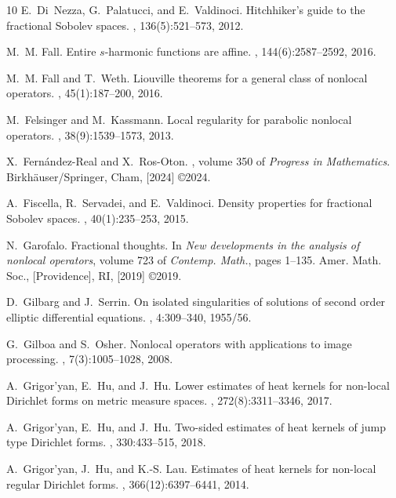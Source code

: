 \documentclass[11pt]{amsart}
\theoremstyle{plain}
\theoremstyle{definition}
\numberwithin{equation}{section}
\begin{document}
\begin{thebibliography}{10}
E.~Di~Nezza, G.~Palatucci, and E.~Valdinoci.
\newblock Hitchhiker's guide to the fractional {S}obolev spaces.
, 136(5):521--573, 2012.

M.~M. Fall.
\newblock Entire {$s$}-harmonic functions are affine.
, 144(6):2587--2592, 2016.

M.~M. Fall and T.~Weth.
\newblock Liouville theorems for a general class of nonlocal operators.
, 45(1):187--200, 2016.

M.~Felsinger and M.~Kassmann.
\newblock Local regularity for parabolic nonlocal operators.
, 38(9):1539--1573, 2013.

X.~Fern\'andez-Real and X.~Ros-Oton.
, volume 350 of {\em
  Progress in Mathematics}.
\newblock Birkh\"auser/Springer, Cham, [2024] \copyright 2024.

A.~Fiscella, R.~Servadei, and E.~Valdinoci.
\newblock Density properties for fractional {S}obolev spaces.
, 40(1):235--253, 2015.

N.~Garofalo.
\newblock Fractional thoughts.
\newblock In {\em New developments in the analysis of nonlocal operators},
  volume 723 of {\em Contemp. Math.}, pages 1--135. Amer. Math. Soc.,
  [Providence], RI, [2019] \copyright 2019.

D.~Gilbarg and J.~Serrin.
\newblock On isolated singularities of solutions of second order elliptic
  differential equations.
, 4:309--340, 1955/56.

G.~Gilboa and S.~Osher.
\newblock Nonlocal operators with applications to image processing.
, 7(3):1005--1028, 2008.

A.~Grigor'yan, E.~Hu, and J.~Hu.
\newblock Lower estimates of heat kernels for non-local {D}irichlet forms on
  metric measure spaces.
, 272(8):3311--3346, 2017.

A.~Grigor'yan, E.~Hu, and J.~Hu.
\newblock Two-sided estimates of heat kernels of jump type {D}irichlet forms.
, 330:433--515, 2018.

A.~Grigor'yan, J.~Hu, and K.-S. Lau.
\newblock Estimates of heat kernels for non-local regular {D}irichlet forms.
, 366(12):6397--6441, 2014.


\end{thebibliography}
\end{document}
